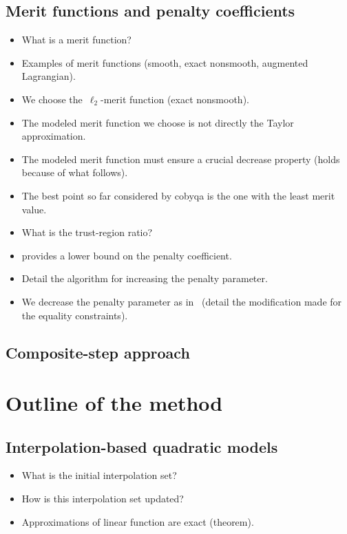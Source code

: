 \subsection{Merit functions and penalty coefficients}
\label{subsec:cobyqa-merit-function}

\begin{itemize}
    \item What is a merit function?
    \item Examples of merit functions (smooth, exact nonsmooth, augmented Lagrangian).
    \item We choose the~$\ell_2$-merit function (exact nonsmooth).
    \item The modeled merit function we choose is not directly the Taylor approximation.
    \item The modeled merit function must ensure a crucial decrease property (holds because of what follows).
    \item The best point so far considered by \gls{cobyqa} is the one with the least merit value.
    \item What is the trust-region ratio?
    \item \Cite[thm.~14.5.1]{Conn_Gould_Toint_2000} provides a lower bound on the penalty coefficient.
    \item Detail the algorithm for increasing the penalty parameter.
    \item We decrease the penalty parameter as in~\cite{Powell_1994} (detail the modification made for the equality constraints).
\end{itemize}

\subsection{Composite-step approach}

\section{Outline of the  method}

\subsection{Interpolation-based quadratic models}
\label{subsec:cobyqa-models}

\begin{itemize}
    \item What is the initial interpolation set?
    \item How is this interpolation set updated?
    \item Approximations of linear function are exact (theorem).
\end{itemize}

